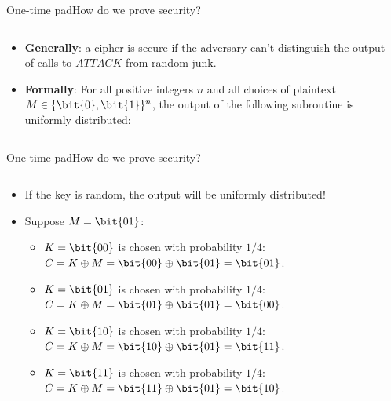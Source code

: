 \documentclass[aspectratio=169, lualatex, handout]{beamer}
\begin{document}
\begin{frame}{One-time pad}{How do we prove security?}
	\begin{columns}[c]
		\begin{column}{0.5\textwidth}
			\begin{itemize}[<+->]
				\item \textbf{Generally}: a cipher is secure if the adversary can't distinguish the output of calls to $ATTACK$ from random junk.
				\item \textbf{Formally}: For all positive integers $n$ and all choices of plaintext $M \in \{\bit{0}, \bit{1}\}^n$, the output of the following subroutine is uniformly distributed:
			\end{itemize}
		\end{column}
		\begin{column}{0.5\textwidth}
		\end{column}
	\end{columns}
\end{frame}

\begin{frame}{One-time pad}{How do we prove security?}
	\begin{columns}[c]
		\begin{column}{0.7\textwidth}
			\begin{itemize}[<+->]
				\item If the key is random, the output will be uniformly distributed!
				\item Suppose $M = \bit{01}$:
				      \begin{itemize}[<+->]
					      \item $K = \bit{00}$ is chosen with probability $1/4$:\\$C = K \oplus M = \bit{00} \oplus \bit{01} = \bit{01}$.
					      \item $K = \bit{01}$ is chosen with probability $1/4$:\\$C = K \oplus M = \bit{01} \oplus \bit{01} = \bit{00}$.
					      \item $K = \bit{10}$ is chosen with probability $1/4$:\\$C = K \oplus M = \bit{10} \oplus \bit{01} = \bit{11}$.
					      \item $K = \bit{11}$ is chosen with probability $1/4$:\\$C = K \oplus M = \bit{11} \oplus \bit{01} = \bit{10}$.
				      \end{itemize}
			\end{itemize}
		\end{column}
		\begin{column}{0.3\textwidth}
		\end{column}
	\end{columns}
\end{frame}
\end{document}
